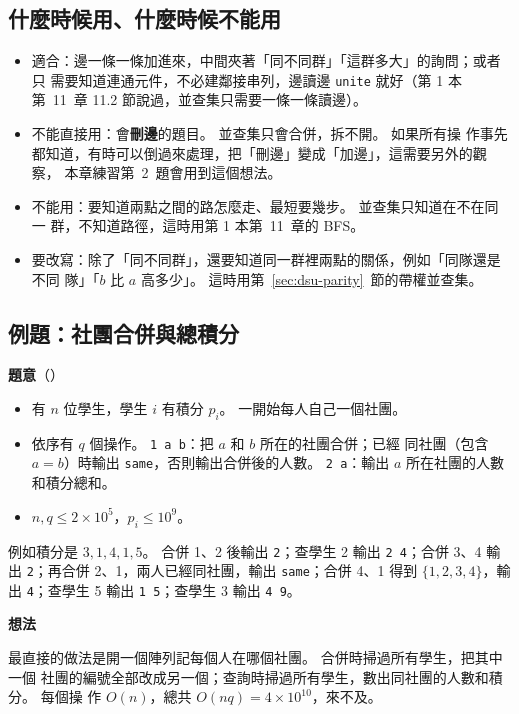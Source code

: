 \subsection{什麼時候用、什麼時候不能用}

\begin{itemize}
\item 適合：邊一條一條加進來，中間夾著「同不同群」「這群多大」的詢問；或者只
需要知道連通元件，不必建鄰接串列，邊讀邊 \texttt{unite} 就好（第 1 本第~11~章 11.2
節說過，並查集只需要一條一條讀邊）。
\item 不能直接用：會\textbf{刪邊}的題目。 並查集只會合併，拆不開。 如果所有操
作事先都知道，有時可以倒過來處理，把「刪邊」變成「加邊」，這需要另外的觀察，
本章練習第~2~題會用到這個想法。
\item 不能用：要知道兩點之間的路怎麼走、最短要幾步。 並查集只知道在不在同一
群，不知道路徑，這時用第 1 本第~11~章的 BFS。
\item 要改寫：除了「同不同群」，還要知道同一群裡兩點的關係，例如「同隊還是不同
隊」「$b$ 比 $a$ 高多少」。 這時用第~\ref{sec:dsu-parity}~節的帶權並查集。
\end{itemize}

\subsection{例題：社團合併與總積分}
\label{sec:ex-club}

\textbf{題意}（）

\begin{itemize}
\item 有 $n$ 位學生，學生 $i$ 有積分 $p_i$。 一開始每人自己一個社團。
\item 依序有 $q$ 個操作。 \texttt{1 a b}：把 $a$ 和 $b$ 所在的社團合併；已經
同社團（包含 $a = b$）時輸出 \texttt{same}，否則輸出合併後的人數。
\texttt{2 a}：輸出 $a$ 所在社團的人數和積分總和。
\item $n, q \le 2 \times 10^5$，$p_i \le 10^9$。
\end{itemize}

例如積分是 $3, 1, 4, 1, 5$。 合併 1、2 後輸出 \texttt{2}；查學生 2 輸出
\texttt{2 4}；合併 3、4 輸出 \texttt{2}；再合併 2、1，兩人已經同社團，輸出
\texttt{same}；合併 4、1 得到 $\{1, 2, 3, 4\}$，輸出 \texttt{4}；查學生 5 輸出
\texttt{1 5}；查學生 3 輸出 \texttt{4 9}。

\textbf{想法}

最直接的做法是開一個陣列記每個人在哪個社團。 合併時掃過所有學生，把其中一個
社團的編號全部改成另一個；查詢時掃過所有學生，數出同社團的人數和積分。 每個操
作 $O(n)$，總共 $O(nq) = 4 \times 10^{10}$，來不及。

